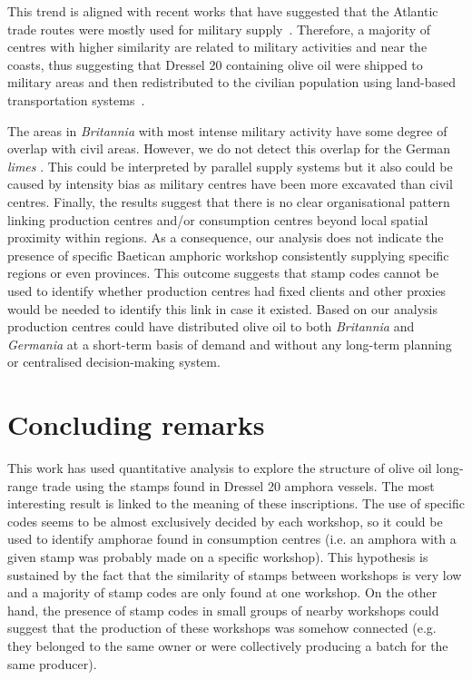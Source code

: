 This trend is aligned with recent works that have suggested that the Atlantic trade routes were mostly used for military supply~\citep{remesal_annona_1986,remesal_provincial_2008,carreras_atlantic_2012,morillo_hispania_2016}. Therefore, a majority of centres with higher similarity are related to military activities and near the coasts, thus suggesting that Dressel 20 containing olive oil were shipped to military areas and then redistributed to the civilian population using land-based transportation systems~\citep{carreras_britannia_1998,orengo_seeds_2016,ayllon_olive_2018}.
 
The areas in \textit{Britannia} with most intense military activity have some degree of overlap with civil areas. However, we do not detect this overlap for the German \textit{limes} \citep{xanten2018}. This could be interpreted by parallel supply systems but it also could be caused by intensity bias as military centres have been more excavated than civil centres.
Finally, the results suggest that there is no clear organisational pattern linking production centres and/or consumption centres beyond local spatial proximity within regions. As a consequence, our analysis does not indicate the presence of specific Baetican amphoric workshop consistently supplying specific regions or even provinces. This outcome suggests that stamp codes cannot be used to identify whether production centres had fixed clients and other proxies would be needed to identify this link in case it existed. Based on our analysis production centres could have distributed olive oil to both \textit{Britannia} and \textit{Germania} at a short-term basis of demand and without any long-term planning or centralised decision-making system.

\section{Concluding remarks}
\label{sec:8}

This work has used quantitative analysis to explore the structure of olive oil long-range trade using the stamps found in Dressel 20 amphora vessels. The most interesting result is linked to the meaning of these inscriptions. The use of specific codes seems to be almost exclusively decided by each workshop, so it could be used to identify amphorae found in consumption centres (i.e. an amphora with a given stamp was probably made on a specific workshop). This hypothesis is sustained by the fact that the similarity of stamps between workshops is very low and a majority of stamp codes are only found at one workshop. On the other hand, the presence of stamp codes in small groups of nearby workshops could suggest that the production of these workshops was somehow connected (e.g. they belonged to the same owner or were collectively producing a batch for the same producer).
 
